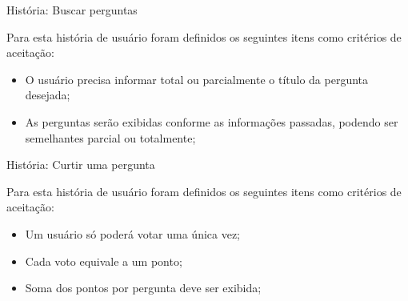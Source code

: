 \def\arraystretch{2}
\begin{quadro}[htb]
\centering
\ABNTEXfontereduzida
\caption[História: Buscar perguntas]{História: Buscar perguntas}
\end{quadro}
\FloatBarrier 

Para esta história de usuário foram definidos os seguintes itens como critérios de aceitação:

\begin{itemize}
\item O usuário precisa informar total ou parcialmente o título da pergunta desejada;
\item As perguntas serão exibidas conforme as informações passadas, podendo ser semelhantes parcial ou totalmente;
\end{itemize}

\def\arraystretch{2}
\begin{quadro}[htb]
\centering
\ABNTEXfontereduzida
\caption[História: Curtir uma pergunta]{História: Curtir uma pergunta}
\end{quadro}
\FloatBarrier 

Para esta história de usuário foram definidos os seguintes itens como critérios de aceitação:

\begin{itemize}
\item Um usuário só poderá votar uma única vez;
\item Cada voto equivale a um ponto;
\item Soma dos pontos por pergunta deve ser exibida;
\end{itemize}

